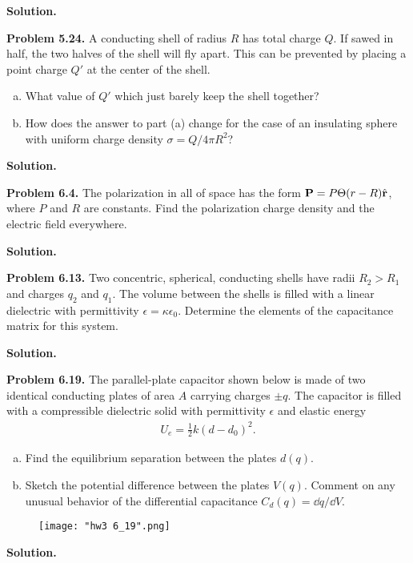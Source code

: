 \documentclass{article}
\begin{document}
\textbf{Solution.}

\hrulefill

\textbf{Problem 5.24.} A conducting shell of radius $R$ has total charge $Q$. If sawed in half, the two halves of the shell will fly apart. This can be prevented by placing a point charge $Q'$ at the center of the shell.
\begin{enumerate}[(a)]
    \item What value of $Q'$ which just barely keep the shell together?
    \item How does the answer to part (a) change for the case of an insulating sphere with uniform charge density $\sigma = Q/4\pi R^2$?
\end{enumerate}

\textbf{Solution.}

\hrulefill

\textbf{Problem 6.4.} The polarization in all of space has the form $\mathbf{P} = P\Theta(r-R)\hat{\vb{r}}$, where $P$ and $R$ are constants. Find the polarization charge density and the electric field everywhere.

\textbf{Solution.}

\hrulefill

\textbf{Problem 6.13.} Two concentric, spherical, conducting shells have radii $R_2>R_1$ and charges $q_2$ and $q_1$. The volume between the shells is filled with a linear dielectric with permittivity $\epsilon = \kappa \epsilon_0$. Determine the elements of the capacitance matrix for this system.

\textbf{Solution.}

\hrulefill

\textbf{Problem 6.19.} The parallel-plate capacitor shown below is made of two identical conducting plates of area $A$ carrying charges $\pm q$. The capacitor is filled with a compressible dielectric solid with permittivity $\epsilon$ and elastic energy
\[
\begin{aligned}
 U_e = \frac{1}{2}k(d-d_0)^2 .
\end{aligned}
\]
\begin{enumerate}[(a)]
 \item Find the equilibrium separation between the plates $d(q)$.
 \item Sketch the potential difference between the plates $V(q)$. Comment on any unusual behavior of the differential capacitance $C_d(q) = \dd q/\dd V$.
\end{enumerate}

\begin{figure}[H]
\centering
\texttt{[image: "hw3 6\_19".png]}
\end{figure}

\textbf{Solution.} 
\end{document}
